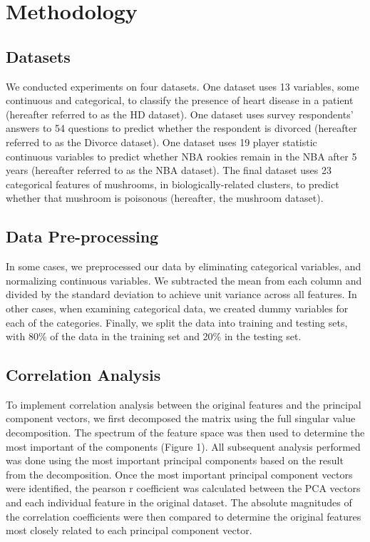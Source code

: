 \documentclass{article}
\begin{document}
\section{Methodology}{

\subsection{Datasets}{We conducted experiments on four datasets. One dataset uses 13 variables, some continuous and categorical, to classify the presence of heart disease in a patient (hereafter referred to as the HD dataset). One dataset uses survey respondents’ answers to 54 questions to predict whether the respondent is divorced (hereafter referred to as the Divorce dataset). One dataset uses 19 player statistic continuous variables to predict whether NBA rookies remain in the NBA after 5 years (hereafter referred to as the NBA dataset). The final dataset uses 23 categorical features of mushrooms, in biologically-related clusters, to predict whether that mushroom is poisonous (hereafter, the mushroom dataset).}


\subsection{Data Pre-processing}{In some cases, we preprocessed our data by eliminating categorical variables, and normalizing continuous variables. We subtracted the mean from each column and divided by the standard deviation to achieve unit variance across all features. In other cases, when examining categorical data, we created dummy variables for each of the categories. Finally, we split the data into training and testing sets, with 80\% of the data in the training set and 20\% in the testing set. }


\subsection{Correlation Analysis}{To implement correlation analysis between the original features and the principal component vectors, we first decomposed the matrix using the full singular value decomposition. The spectrum of the feature space was then used to determine the most important of the components (Figure 1). All subsequent analysis performed was done using the most important principal components based on the result from the decomposition. Once the most important principal component vectors were identified, the pearson r coefficient was calculated between the PCA vectors and each individual feature in the original dataset. The absolute magnitudes of the correlation coefficients were then compared to determine the original features most closely related to each principal component vector.}


}
\end{document}
